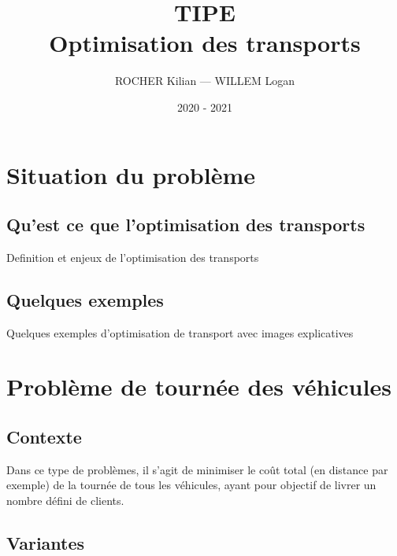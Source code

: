 \documentclass[10pt]{beamer}
\title[TIPE — Optimisation des transports]{TIPE \\ Optimisation des transports}
\author{ROCHER Kilian — WILLEM Logan}
\date{2020 - 2021}
\begin{document}
	\begin{frame}[plain]
		\maketitle
	\end{frame}

	\begin{frame}[plain]
		\tableofcontents
	\end{frame}

	\section{Situation du problème}
	
	\subsection{Qu'est ce que l'optimisation des transports}
	
	\begin{frame}
		Definition et enjeux de l'optimisation des transports
	\end{frame}
	
	\subsection{Quelques exemples}
	
	\begin{frame}
		Quelques exemples d'optimisation de transport avec images explicatives
	\end{frame}
	
	\section{Problème de tournée des véhicules}
	
	\subsection{Contexte}
	
	\begin{frame}
		Dans ce type de problèmes, il s'agit de minimiser le coût total (en distance par exemple) de la tournée de tous les véhicules, ayant pour objectif de livrer un nombre défini de clients.
	\end{frame}

	\subsection{Variantes}
	
\end{document}
